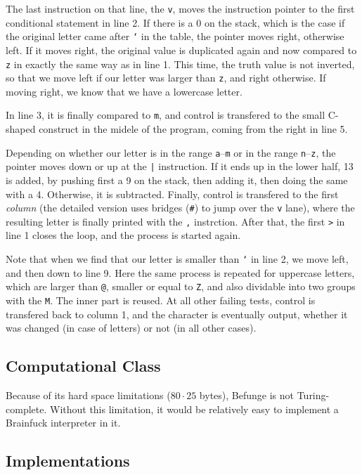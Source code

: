 The last instruction on that line, the \texttt{v}, moves the instruction pointer to the first conditional statement in line 2. If there is a 0 on the stack, which is the case if the original letter came after \texttt{`} in the \ascii{} table, the pointer moves right, otherwise left. If it moves right, the original value is duplicated again and now compared to \texttt{z} in exactly the same way as in line 1. This time, the truth value is not inverted, so that we move left if our letter was larger than \texttt{z}, and right otherwise. If moving right, we know that we have a lowercase letter.

In line 3, it is finally compared to \texttt{m}, and control is transfered to the small C-shaped construct in the midele of the program, coming from the right in line 5.

Depending on whether our letter is in the range \texttt{a}--\texttt{m} or in the range \texttt{n}--\texttt{z}, the pointer moves down or up at the \texttt{|} instruction. If it ends up in the lower half, 13 is added, by pushing first a 9 on the stack, then adding it, then doing the same with a 4. Otherwise, it is subtracted. Finally, control is transfered to the first \emph{column} (the detailed version uses bridges (\texttt{\#}) to jump over the \texttt{v} lane), where the resulting letter is finally printed with the \texttt{,} instrction. After that, the first \texttt{>} in line 1 closes the loop, and the process is started again.

Note that when we find that our letter is smaller than \texttt{`} in line 2, we move left, and then down to line 9. Here the same process is repeated for uppercase letters, which are larger than \texttt{@}, smaller or equal to \texttt{Z}, and also dividable into two groups with the \texttt{M}. The inner part is reused. At all other failing tests, control is transfered back to column 1, and the character is eventually output, whether it was changed (in case of letters) or not (in all other cases).

\subsection{Computational Class}

Because of its hard space limitations ($80\cdot 25$ bytes), Befunge is not Turing-complete. Without this limitation, it would be relatively easy to implement a Brainfuck interpreter in it.

\subsection{Implementations}

